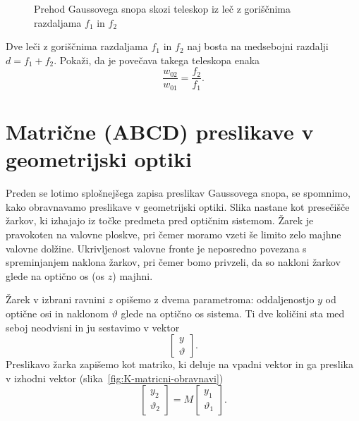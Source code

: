 \begin{figure}[h]
\def\svgwidth{145truemm} 

\caption{Prehod Gaussovega snopa
skozi teleskop iz leč z goriščnima razdaljama $f_{1}$ in $f_{2}$}
\label{fig:Prehod-Gaussovega-snopa-teleskop}
\end{figure}

\begin{definition}
\label{teleskop}
Dve leči z goriščnima razdaljama $f_{1}$ in $f_{2}$ naj bosta na medsebojni
razdalji $d=f_{1}+f_{2}$. Pokaži, da je povečava takega teleskopa enaka  
\begin{equation}
\frac{w_{02}}{w_{01}}=\frac{f_{2}}{f_{1}}.
\label{eq:povecava-teleskop}
\end{equation}
\end{definition}

\section{Matrične (ABCD) preslikave v geometrijski optiki}

Preden se lotimo splošnejšega zapisa preslikav Gaussovega snopa, 
se spomnimo, kako obravnavamo preslikave v geometrijski optiki. 
Slika nastane kot presečišče žarkov,
ki izhajajo iz točke predmeta pred optičnim sistemom. Žarek 
je pravokoten na valovne ploskve, pri čemer moramo vzeti še limito zelo majhne
valovne dolžine. Ukrivljenost valovne fronte je neposredno
povezana s spreminjanjem naklona žarkov, pri čemer bomo privzeli, da so 
nakloni žarkov glede na optično os (os $z$) majhni.

Žarek v izbrani ravnini $z$ opišemo z dvema parametroma: 
oddaljenostjo $y$ od optične osi in naklonom $\vartheta$ glede na optično os sistema. 
Ti dve količini sta med seboj neodvisni in ju sestavimo v vektor
\begin{equation}
\left[\begin{array}{c}
y\\
\vartheta
\end{array}\right].
\end{equation}
Preslikavo žarka zapišemo kot matriko, ki deluje na vpadni vektor in ga preslika
v izhodni vektor (slika~\ref{fig:K-matricni-obravnavi})
\begin{equation}
\left[\begin{array}{c}
y_2\\
\vartheta_2
\end{array}\right] = M \left[\begin{array}{c}
y_1\\
\vartheta_1
\end{array}\right].
\end{equation}

